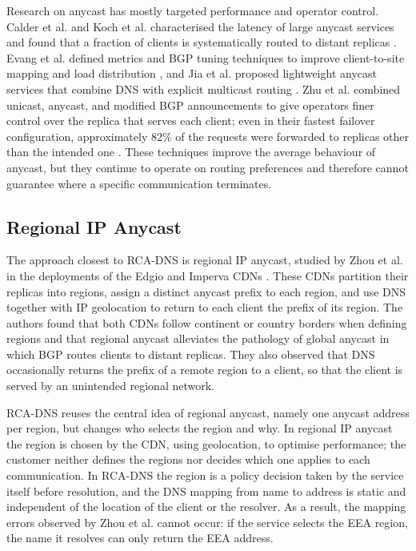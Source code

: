Research on anycast has mostly targeted performance and operator control. Calder et al. and Koch et al. characterised the latency of large anycast services and found that a fraction of clients is systematically routed to distant replicas \cite{Calder2015AnalyzingCDN, Koch2021AnycastSystems}. Evang et al. defined metrics and BGP tuning techniques to improve client-to-site mapping and load distribution \cite{Evang2024AnycastTuning}, and Jia et al. proposed lightweight anycast services that combine DNS with explicit multicast routing \cite{Jia2019DeployingInternet}. Zhu et al. combined unicast, anycast, and modified BGP announcements to give operators finer control over the replica that serves each client; even in their fastest failover configuration, approximately 82\% of the requests were forwarded to replicas other than the intended one \cite{Zhu2022TheWorlds}. These techniques improve the average behaviour of anycast, but they continue to operate on routing preferences and therefore cannot guarantee where a specific communication terminates.

\subsection{Regional IP Anycast}
\label{sc:rcadns_related_regional_anycast}

The approach closest to RCA-DNS is regional IP anycast, studied by Zhou et al. in the deployments of the Edgio and Imperva CDNs \cite{Zhou2023RegionalPotentials}. These CDNs partition their replicas into regions, assign a distinct anycast prefix to each region, and use DNS together with IP geolocation to return to each client the prefix of its region. The authors found that both CDNs follow continent or country borders when defining regions and that regional anycast alleviates the pathology of global anycast in which BGP routes clients to distant replicas. They also observed that DNS occasionally returns the prefix of a remote region to a client, so that the client is served by an unintended regional network.

RCA-DNS reuses the central idea of regional anycast, namely one anycast address per region, but changes who selects the region and why. In regional IP anycast the region is chosen by the CDN, using geolocation, to optimise performance; the customer neither defines the regions nor decides which one applies to each communication. In RCA-DNS the region is a policy decision taken by the service itself before resolution, and the DNS mapping from name to address is static and independent of the location of the client or the resolver. As a result, the mapping errors observed by Zhou et al. cannot occur: if the service selects the EEA region, the name it resolves can only return the EEA address.

